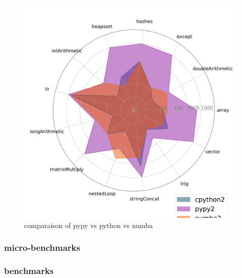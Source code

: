 \begin{figure}[thb]
    \centering
    \includegraphics[width=\linewidth]{imgs/tommti_compare__cpython2_pypy2_numba2}
    \caption{comparaison of pypy vs python vs numba }
    \label{fig:p2}
\end{figure}





\subsubsection{micro-benchmarks}

\subsubsection{benchmarks}

